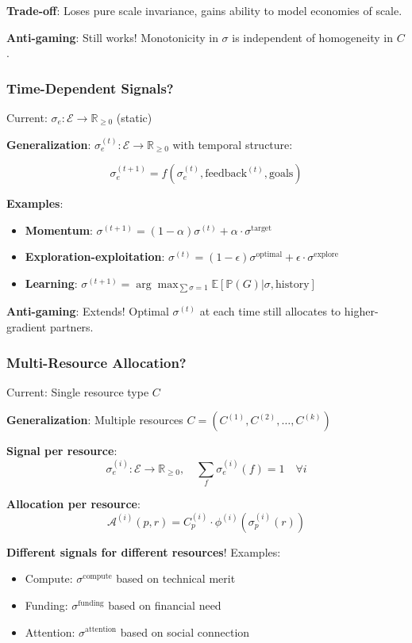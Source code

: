 \documentclass[11pt,a4paper]{article}
\theoremstyle{definition}
\theoremstyle{remark}
\newcommand{\E}{\mathcal{E}}
\begin{document}
\textbf{Trade-off}: Loses pure scale invariance, gains ability to model economies of scale.

\textbf{Anti-gaming}: Still works! Monotonicity in $\sigma$ is independent of homogeneity in $C$.

\subsubsection{Time-Dependent Signals?}

Current: $\sigma_e: \E \to \mathbb{R}_{\ge 0}$ (static)

\textbf{Generalization}: $\sigma_e^{(t)}: \E \to \mathbb{R}_{\ge 0}$ with temporal structure:

\[ \sigma_e^{(t+1)} = f(\sigma_e^{(t)}, \text{feedback}^{(t)}, \text{goals}) \]

\textbf{Examples}:
\begin{itemize}
\item \textbf{Momentum}: $\sigma^{(t+1)} = (1-\alpha)\sigma^{(t)} + \alpha \cdot \sigma^{\text{target}}$
\item \textbf{Exploration-exploitation}: $\sigma^{(t)} = (1-\epsilon)\sigma^{\text{optimal}} + \epsilon \cdot \sigma^{\text{explore}}$
\item \textbf{Learning}: $\sigma^{(t+1)} = \arg\max_{\sum \sigma=1} \mathbb{E}[\mathbb{P}(G) | \sigma, \text{history}]$
\end{itemize}

\textbf{Anti-gaming}: Extends! Optimal $\sigma^{(t)}$ at each time still allocates to higher-gradient partners.

\subsubsection{Multi-Resource Allocation?}

Current: Single resource type $C$

\textbf{Generalization}: Multiple resources $C = (C^{(1)}, C^{(2)}, \ldots, C^{(k)})$

\textbf{Signal per resource}:
\[ \sigma_e^{(i)}: \E \to \mathbb{R}_{\ge 0}, \quad \sum_f \sigma_e^{(i)}(f) = 1 \quad \forall i \]

\textbf{Allocation per resource}:
\[ \mathcal{A}^{(i)}(p,r) = C_p^{(i)} \cdot \phi^{(i)}(\sigma_p^{(i)}(r)) \]

\textbf{Different signals for different resources}! Examples:
\begin{itemize}
\item Compute: $\sigma^{\text{compute}}$ based on technical merit
\item Funding: $\sigma^{\text{funding}}$ based on financial need
\item Attention: $\sigma^{\text{attention}}$ based on social connection
\end{itemize}
\end{document}
